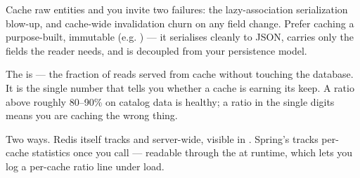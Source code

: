 \begin{perfnote}
Cache raw entities and you invite two failures: the lazy-association serialization blow-up, and cache-wide invalidation churn on any field change. Prefer caching a purpose-built, immutable  (e.g. ) --- it serialises cleanly to JSON, carries only the fields the reader needs, and is decoupled from your persistence model.
\end{perfnote}


 The  is  --- the fraction of reads served from cache without touching the database. It is the single number that tells you whether a cache is earning its keep. A ratio above roughly 80--90\% on catalog data is healthy; a ratio in the single digits means you are caching the wrong thing.

 Two ways. Redis itself tracks  and  server-wide, visible in . Spring's  tracks per-cache statistics once you call  --- readable through the  at runtime, which lets you log a per-cache ratio line under load.


